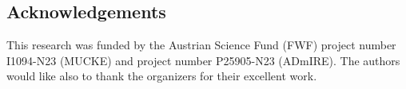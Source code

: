 \documentclass[a0,portrait]{a0poster}
\begin{document}
\begin{multicols}{2}
\color{Navy} %
\section*{Acknowledgements}

\color{SaddleBrown} %
This research was funded by the Austrian Science Fund (FWF) project number I1094-N23 (MUCKE) and project number P25905-N23 (ADmIRE). 
The authors would like also to thank the organizers for their excellent work.

\color{DarkSlateGray} %

\end{multicols}
\end{document}
